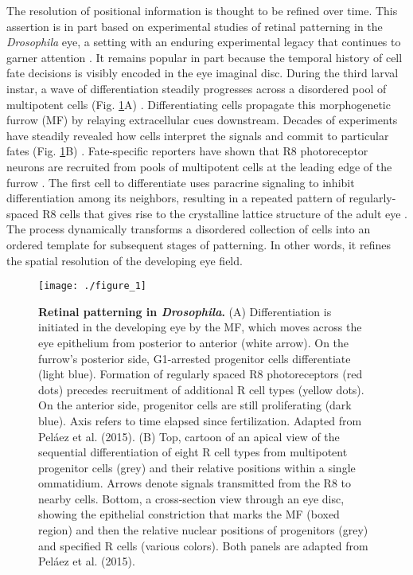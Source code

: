 The resolution of positional information is thought to be refined over time. This assertion is in part based on experimental studies of retinal patterning in the \textit{Drosophila} eye, a setting with an enduring experimental legacy that continues to garner attention \cite{Bellen2010,Beira2016}. It remains popular in part because the temporal history of cell fate decisions is visibly encoded in the eye imaginal disc. During the third larval instar, a wave of differentiation steadily progresses across a disordered pool of multipotent cells (Fig. \ref{fig:intro:retinal_patterning}A) \cite{Ready1976a,Tomlinson1987a}. Differentiating cells propagate this morphogenetic furrow (MF) by relaying extracellular cues downstream. Decades of experiments have steadily revealed how cells interpret the signals and commit to particular fates (Fig. \ref{fig:intro:retinal_patterning}B) \cite{Voas2004}. Fate-specific reporters have shown that R8 photoreceptor neurons are recruited from pools of multipotent cells at the leading edge of the furrow \cite{Jarman1994}. The first cell to differentiate uses paracrine signaling to inhibit differentiation among its neighbors, resulting in a repeated pattern of regularly-spaced R8 cells that gives rise to the crystalline lattice structure of the adult eye \cite{Frankfort2002a}. The process dynamically transforms a disordered collection of cells into an ordered template for subsequent stages of patterning. In other words, it refines the spatial resolution of the developing eye field.

\begin{figure}[h!]
\centering
\texttt{[image: ./figure\_1]}
\caption[Retinal patterning in \emph{Drosophila}.] {\textbf{Retinal patterning in \emph{Drosophila}.} (A) Differentiation is initiated in the developing eye by the MF, which moves across the eye epithelium from posterior to anterior (white arrow). On the furrow's posterior side, G1-arrested progenitor cells differentiate (light blue). Formation of regularly spaced R8 photoreceptors (red dots) precedes recruitment of additional R cell types (yellow dots). On the anterior side, progenitor cells are still proliferating (dark blue). Axis refers to time elapsed since fertilization. Adapted from Pel\'{a}ez et al. (2015). (B) Top, cartoon of an apical view of the sequential differentiation of eight R cell types from multipotent progenitor cells (grey) and their relative positions within a single ommatidium. Arrows denote signals transmitted from the R8 to nearby cells. Bottom, a cross-section view through an eye disc, showing the epithelial constriction that marks the MF (boxed region) and then the relative nuclear positions of progenitors (grey) and specified R cells (various colors). Both panels are adapted from Pel\'{a}ez et al. (2015).}
\label{fig:intro:retinal_patterning}
\end{figure}

